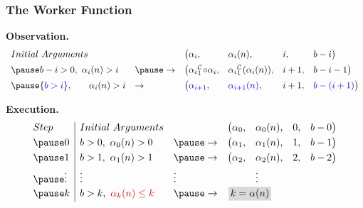\begin{frame}
\frametitle{The Worker Function}

\textbf{Observation.}
\begin{equation*}
\begin{array}{lllllll}
Initial \ Arguments & & \big(\alpha_i, & \alpha_i(n), & i, & b - i \big) \\[5pt]
\pause
b - i > 0, \ \alpha_i(n) > i & \pause \to & \big(\cdt{\alpha_i}{1}\circ \alpha_i, & \cdt{\alpha_i}{1}(\alpha_i(n)), & i + 1, & b - i - 1\big) \\[5pt]
\pause
{\color{blue} b > i}, \ \hspace{15pt} \alpha_i(n) > i & \to  & \big({\color{blue} \alpha_{i+1}}, & {\color{blue} \alpha_{i+1}(n)}, & i + 1, & {\color{blue} b - (i + 1)}\big) \\
\end{array}
\end{equation*}

\pause
\textbf{Execution.}
\begin{equation*}
\begin{array}{l|lllllll}
Step & Initial \ Arguments &  &  \big(\alpha_0, & \alpha_0(n), & 0, & b - 0 \big) \\[3pt]
\pause
0 & b > 0, \ \alpha_0(n) > 0 & \pause \to & \big(\alpha_1, & \alpha_1(n), & 1, & b - 1\big) \\[3pt]
\pause
1 & b > 1, \ \alpha_1(n) > 1 & \pause \to  & \big(\alpha_2, & \alpha_2(n), & 2, & b - 2\big) \\[3pt]
\pause
\vdots & \vdots & \vdots & & \multicolumn{3}{l}{\vdots} \\
\pause
k & b > k, \ {\color{red} \alpha_{k}(n) \le k} & \pause \to  & \multicolumn{4}{l}{\impinline{$k = \alpha(n)$}}
\end{array}
\end{equation*}
\end{frame}



